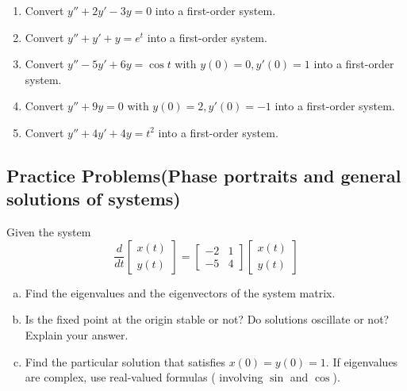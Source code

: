       \begin{question}
        \begin{enumerate}
          \item Convert \(y'' + 2y' - 3y = 0\) into a first-order system.
          \item Convert \(y'' + y' + y = e^t\) into a first-order system.
          \item Convert \(y'' - 5y' + 6y = \cos t\) with \(y(0)=0, y'(0)=1\) into a first-order system.
          \item Convert \(y'' + 9y = 0\) with \(y(0)=2, y'(0)=-1\) into a first-order system.
          \item Convert \(y'' + 4y' + 4y = t^2\) into a first-order system.
        \end{enumerate}
      \end{question}



    \subsection{Practice Problems(Phase portraits and general solutions of systems)}

      \begin{question}
      Given the system
        \[
          \frac{d}{dt}
          \begin{bmatrix}
            x(t) \\ y(t)
          \end{bmatrix} =
          \begin{bmatrix}
          -2 & 1 \\ -5 & 4
          \end{bmatrix}
          \begin{bmatrix}
            x(t) \\ y(t)
          \end{bmatrix}
        \]
        \begin{enumerate}[(a)]
        \item Find the eigenvalues and the eigenvectors of the system matrix.
      \solspace{3in}
        \item Is the fixed point at the origin stable or not? Do solutions oscillate or not? Explain your answer.
      \solspace{0.5in}
        \item Find the particular solution that satisfies \(x(0) = y(0) = 1\). If eigenvalues are complex, use real-valued formulas ( involving \(\sin\) and \(\cos\)).
      \solspace{3in}
      \end{enumerate}
      \end{question}

